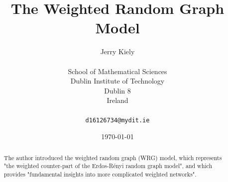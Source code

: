 \documentclass{report}
\begin{document}
\title{The Weighted Random Graph Model}
\author{Jerry Kiely\\
	\\
	School of Mathematical Sciences\\
	Dublin Institute of Technology\\
	Dublin 8\\
	Ireland\\
	\\
	\texttt{d16126734@mydit.ie}}
\date{\today}
\maketitle


\tableofcontents

\newpage










\begin{abstract}
The author introduced the weighted random graph (WRG) model, which represents "the weighted counter-part 
of the Erdos-R\'{e}nyi random graph model", and which provides "fundamental insights into more complicated 
weighted networks". 
\end{abstract}
\end{document}
